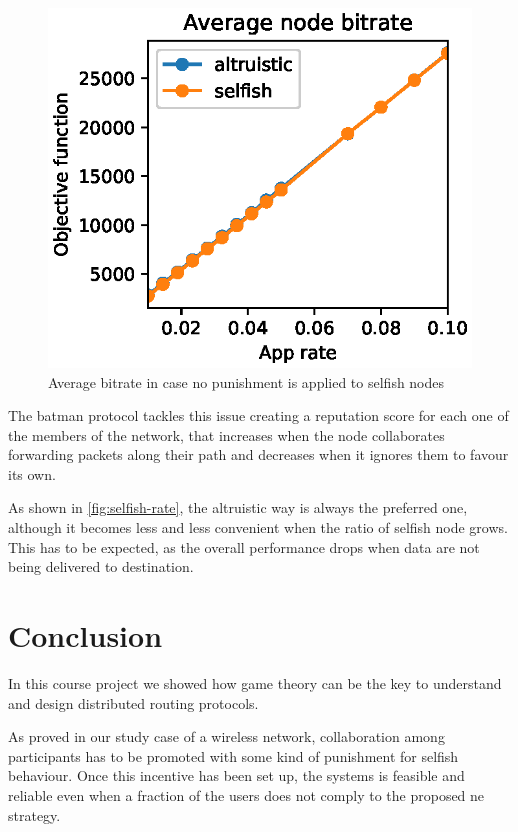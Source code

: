 \documentclass[conference]{IEEEtran}
\begin{document}
\begin{figure}[h]
  \includegraphics{figures/obj_func_vs_app_rate_no_punish.eps}
  \caption{Average bitrate in case no punishment is applied to selfish nodes}
  \label{fig:no-blame-app-rate}
\end{figure}

The \gls{batman} protocol tackles this issue creating a reputation score for each one of the members of the network, that increases when the node collaborates forwarding packets along their path and decreases when it ignores them to favour its own.

As shown in \autoref{fig:selfish-rate}, the altruistic way is always the preferred one, although it becomes less and less convenient when the ratio of selfish node grows. This has to be expected, as the overall performance drops when data are not being delivered to destination.


\section{Conclusion}

In this course project we showed how game theory can be the key to understand and design distributed routing protocols.

As proved in our study case of a wireless network, collaboration among participants has to be promoted with some kind of punishment for selfish behaviour.
Once this incentive has been set up, the systems is feasible and reliable even when a fraction of the users does not comply to the proposed \gls{ne} strategy.

\nocite{*}


\end{document}
